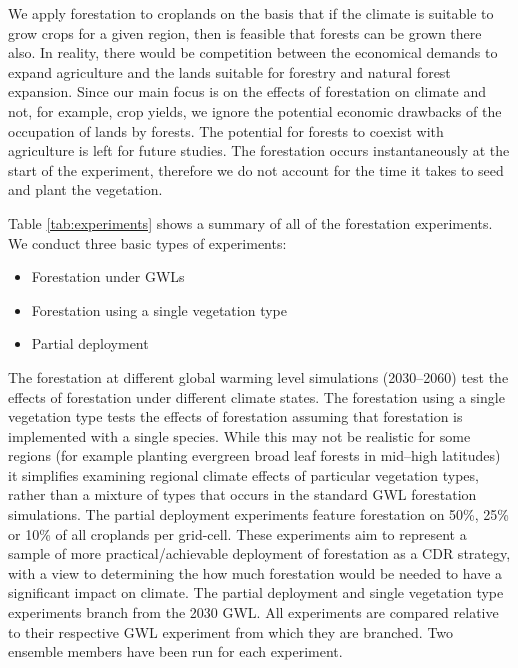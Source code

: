 \documentclass[]{article}
\begin{document}
We apply forestation to croplands on the basis that if the climate is suitable to grow crops for a given region, then is feasible that forests can be grown there also. In reality, there would be competition between the economical demands to expand agriculture and the lands suitable for forestry and natural forest expansion.
Since our main focus is on the effects of forestation on climate and not, for example, crop yields, we ignore the potential economic drawbacks of the occupation of lands by forests.
The potential for forests to coexist with agriculture is left for future studies.
The forestation occurs instantaneously at the start of the experiment, therefore we do not account for the time it takes to seed and plant the vegetation.

Table \ref{tab:experiments} shows a summary of all of the forestation experiments. We conduct three basic types of experiments:

\begin{itemize}
    \item Forestation under GWLs
    \item Forestation using a single vegetation type
    \item Partial deployment
\end{itemize}

The forestation at different global warming level simulations (2030–2060) test the effects of forestation under different climate states.
The forestation using a single vegetation type tests the effects of forestation assuming that forestation is implemented with a single species.
While this may not be realistic for some regions (for example planting evergreen broad leaf forests in mid–high latitudes) it simplifies examining regional climate effects of particular vegetation types, rather than a mixture of types that occurs in the standard GWL forestation simulations.
The partial deployment experiments feature forestation on 50\%, 25\% or 10\% of all croplands per grid-cell.
These experiments aim to represent a sample of more practical/achievable deployment of forestation as a CDR strategy, with a view to determining the how much forestation would be needed to have a significant impact on climate.
The partial deployment and single vegetation type experiments branch from the 2030 GWL.
All experiments are compared relative to their respective GWL experiment from which they are branched.
Two ensemble members have been run for each experiment.
\end{document}
